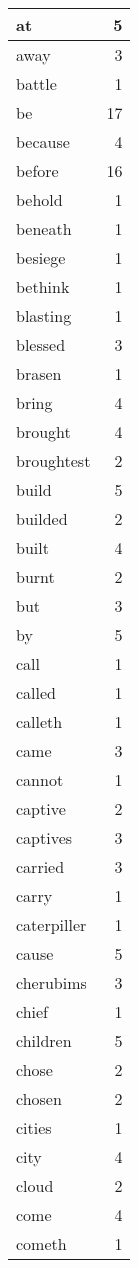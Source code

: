 \begin{center}
\begin{longtable}{l|r}
at & 5 \\ \hline
away & 3 \\ \hline
battle & 1 \\ \hline
be & 17 \\ \hline
because & 4 \\ \hline
before & 16 \\ \hline
behold & 1 \\ \hline
beneath & 1 \\ \hline
besiege & 1 \\ \hline
bethink & 1 \\ \hline
blasting & 1 \\ \hline
blessed & 3 \\ \hline
brasen & 1 \\ \hline
bring & 4 \\ \hline
brought & 4 \\ \hline
broughtest & 2 \\ \hline
build & 5 \\ \hline
builded & 2 \\ \hline
built & 4 \\ \hline
burnt & 2 \\ \hline
but & 3 \\ \hline
by & 5 \\ \hline
call & 1 \\ \hline
called & 1 \\ \hline
calleth & 1 \\ \hline
came & 3 \\ \hline
cannot & 1 \\ \hline
captive & 2 \\ \hline
captives & 3 \\ \hline
carried & 3 \\ \hline
carry & 1 \\ \hline
caterpiller & 1 \\ \hline
cause & 5 \\ \hline
cherubims & 3 \\ \hline
chief & 1 \\ \hline
children & 5 \\ \hline
chose & 2 \\ \hline
chosen & 2 \\ \hline
cities & 1 \\ \hline
city & 4 \\ \hline
cloud & 2 \\ \hline
come & 4 \\ \hline
cometh & 1 \\ \hline

\end{longtable}
\end{center}
